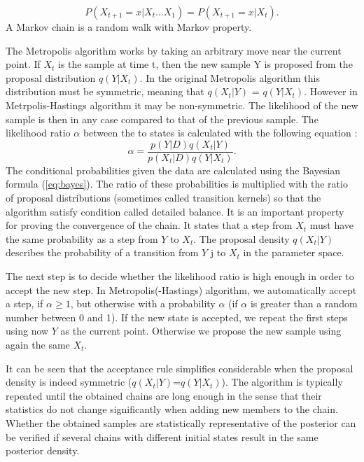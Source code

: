 \documentclass{wihuri}
\def\be{\begin{equation}}
\def\ee{\end{equation}}
\begin{document}
 \be \label{eq:markov_prop}
P(X_{t+1} = x|X_{t}. . . X_{1}) = P(X_{t+1} = x|X_{t}).
\ee
A Markov chain is a random walk with Markov property.
 
The Metropolis algorithm works by taking an arbitrary move near the current
point. If $X_{t}$ is the sample at time t, then the new sample Y is proposed from the proposal distribution $q(Y|X_{t})$. In the original Metropolis algorithm this distribution must be symmetric, meaning that $q(X_{t}|Y)$ = $q(Y|X_{t})$. However in Metrpolis-Hastings algorithm it may be non-symmetric. The likelihood of the new sample is then in any case compared to that of the previous sample. The likelihood ratio $\alpha$ between the to states is calculated with the following equation \cite{tuomi}:
\be \label{eq:likely_ratio} 
\alpha = \frac{p(Y|D)q(X_{t}|Y)}{p(X_{t}|D)q(Y|X_{t})}.
\ee
The conditional probabilities given the data are calculated using the Bayesian formula (\ref{eq:bayes}). The ratio of these probabilities is multiplied with the ratio of proposal distributions (sometimes called transition kernels) so that the algorithm satisfy condition called detailed balance. It is an important property for proving the convergence of the chain. It states that a step from $X_{t}$ must have the same probability as a step from $Y$ to $X_{t}$.  The proposal density $q(X_{t}|Y)$ describes the probability of a transition from $Y$ j to $X_{t}$ in the parameter space.

The next step is to decide whether the likelihood ratio is high enough in order to accept the new step. In Metropolis(-Hastings) algorithm, we automatically accept a step, if $\alpha \ge 1$, but otherwise with a probability $\alpha$ (if $\alpha$ is greater than a random number between 0 and 1). If the new state is accepted, we repeat the first steps using now $Y$ as the current point. Otherwise we propose the new sample using again the same $X_{t}$. 



It can be seen that the acceptance rule simplifies considerable when the
proposal density is indeed symmetric ($q(X_{t}|Y)$=$q(Y|X_{t})$). The algorithm is typically repeated until the obtained chains are long enough in the sense that their statistics do not change significantly when adding new members to the chain. Whether the obtained samples are statistically representative of the posterior can be verified if several chains with different initial states result in the same posterior density.
\end{document}
